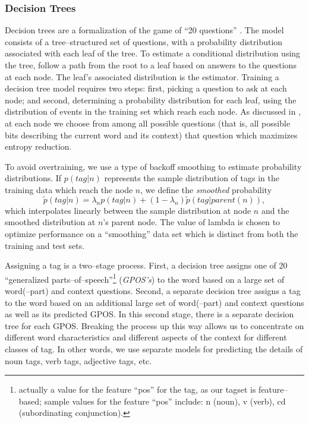 \subsubsection{Decision Trees}

Decision trees are a formalization of the game of ``20 questions''
\cite{CART,Black+al:tag}.  The model consists of a tree--structured set
of questions, with a probability distribution associated with each
leaf of the tree. To estimate a conditional distribution using the
tree, follow a path from the root to a leaf based on answers to the
questions at each node. The leaf's associated distribution is the
estimator.  Training a decision tree model requires two steps: first,
picking a question to ask at each node; and second, determining a
probability distribution for each leaf, using the distribution of
events in the training set which reach each node.  As discussed in
\cite{Black+al:tag}, at each node we choose from among all possible
questions (that is, all possible bits describing the current word and
its context) that question which maximizes entropy reduction.

To avoid overtraining, we use a type of backoff smoothing to 
estimate probability distributions. If $p(tag | n)$ represents
the sample distribution of tags in the training data which reach
the node $n$, we define the {\em smoothed} probability
$$
\tilde{p}(tag|n) = \lambda_{n} p(tag|n) + 
		 (1-\lambda_{n})\tilde{p}(tag|parent(n)),
$$
which interpolates linearly between the sample distribution at node $n$ 
and the smoothed distribution at $n$'s parent node. The value of
lambda is chosen to optimize performance on a ``smoothing'' data set 
which is distinct from both the training and test sets.

Assigning a tag is a two--stage process. First, a decision tree
assigns one of 20 ``generalized parts--of--speech''\footnote{actually
a value for the feature ``pos'' for the tag, as our tagset is
feature--based; sample values for the feature ``pos'' include: n
(noun), v (verb), cd (subordinating conjunction).} ({\em GPOS's}) to
the word based on a large set of word(--part) and context questions.
Second, a separate decision tree assigns a tag to the word based on an
additional large set of word(--part) and context questions as well as
its predicted GPOS.  In this second stage, there is a separate
decision tree for each GPOS.  Breaking the process up this way allows
us to concentrate on different word characteristics and different
aspects of the context for different classes of tag. In other words,
we use separate models for predicting the details of noun tags, verb
tags, adjective tags, etc.

